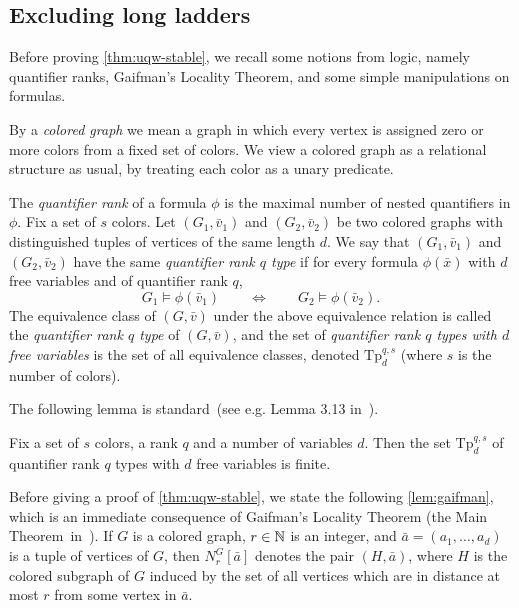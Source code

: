 \subsection{Excluding long ladders}
\label{sec:uqw-stable}

Before  proving \cref{thm:uqw-stable}, we recall some notions from logic, namely quantifier ranks, Gaifman's Locality Theorem, and some simple manipulations on formulas.


By a \emph{colored graph} we mean a graph  in which 
every vertex is assigned zero or more colors from a fixed set of colors. We view a colored graph as a relational structure as usual, by treating each color as a unary predicate. 

The \emph{quantifier rank} of a formula $\phi$ is the maximal number of nested quantifiers in $\phi$. Fix a set of $s$ colors.
Let $(G_1,\bar v_1)$ and $(G_2,\bar v_2)$ be two
colored graphs with distinguished tuples of vertices of the same length $d$. We say that $(G_1,\bar v_1)$ and $(G_2,\bar v_2)$
have the same \emph{quantifier rank $q$ type} %
if for every formula $\phi(\bar x)$ with $d$ free variables and of quantifier rank $q$,
 $$G_1\models \phi(\bar v_1)\qquad\iff \qquad G_2\models \phi(\bar v_2).$$
 The equivalence class of $(G,\bar v)$ under the above equivalence relation is called the \emph{quantifier rank $q$ type} of $(G,\bar v)$, and  the set of \emph{quantifier rank $q$ types with $d$ free variables}
is the set of all equivalence classes, denoted
$\mathrm{Tp}^{q,s}_d$ (where $s$ is the number of colors).

The following lemma is standard~(see e.g. Lemma 3.13 in~\cite{libkin}).
\begin{lemma}\label{lem:q-types}
	Fix a set of $s$ colors, a rank $q$ and a number of variables $d$.
	Then the set $\mathrm{Tp}^{q,s}_d$ of quantifier rank $q$ types with $d$ free variables is finite.
\end{lemma}


Before giving a proof of \cref{thm:uqw-stable},
we state the following \cref{lem:gaifman}, which is an
immediate consequence of Gaifman's Locality Theorem
(the Main Theorem~in~\cite{gaifman1982local}).
 If $G$ is a colored graph, $r\in\mathbb{N}$ is an integer, and $\bar a=(a_1,\ldots,a_d)$ is a tuple of vertices of $G$, then  $N^G_r[\bar a]$ denotes the pair $(H,\bar a)$, where $H$ is the colored subgraph of $G$
induced by the set of all vertices which are in distance at most $r$
from some vertex in $\bar a$.

